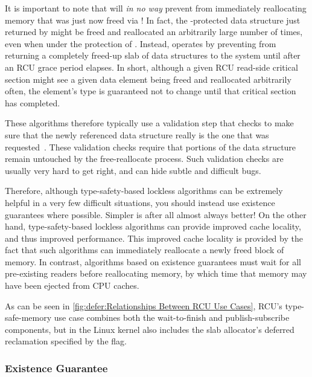 It is important to note that  will
\emph{in no way}
prevent  from immediately reallocating
memory that was just now freed via !
In fact, the -protected data structure
just returned by  might be freed and reallocated
an arbitrarily large number of times, even when under the protection
of .
Instead,  operates by preventing
from returning a completely freed-up slab of data structures
to the system until after an RCU grace period elapses.
In short, although a given RCU read-side critical section might see a
given  data element being freed and reallocated
arbitrarily often, the element's type is guaranteed not to change until
that critical section has completed.

These algorithms therefore typically use a validation step that checks
to make sure that the newly referenced data structure really is the one
that was requested~\cite[Section~2.5]{LaninShasha1986TSM}.
These validation checks require that portions of the data structure
remain untouched by the free-reallocate process.
Such validation checks are usually very hard to get right, and can
hide subtle and difficult bugs.

Therefore, although type-safety-based lockless algorithms can be extremely
helpful in a very few difficult situations, you should instead use existence
guarantees where possible.
Simpler is after all almost always better!
On the other hand, type-safety-based lockless algorithms can
provide improved cache locality, and thus improved performance.
This improved cache locality is provided by the fact that such
algorithms can immediately reallocate a newly freed block of memory.
In contrast, algorithms based on existence guarantees must wait for
all pre-existing readers before reallocating memory, by which time
that memory may have been ejected from CPU caches.

As can be seen in \cref{fig:defer:Relationships Between RCU Use Cases},
RCU's type-safe-memory use case combines both the wait-to-finish
and publish-subscribe components, but in the Linux kernel also includes
the slab allocator's deferred reclamation specified by the
 flag.

\subsubsection{Existence Guarantee}
\label{sec:defer:Existence Guarantee}

